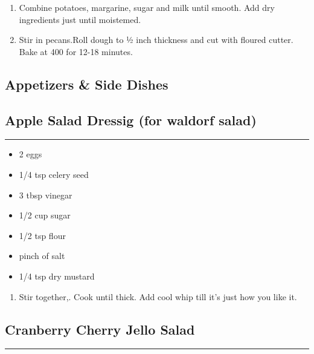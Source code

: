 \documentclass{article}
\begin{document}
\begin{enumerate}
    \item
        Combine potatoes, margarine, sugar and milk until smooth. Add dry ingredients just until moistemed.
    \item
        Stir in pecans.Roll dough to ½ inch thickness and cut with floured cutter. Bake at 400 for 12-18 minutes.
\end{enumerate}
\newpage

\vspace*{\fill}
\begin{center}
    \section{Appetizers \& Side Dishes}
\end{center}
\vspace*{\fill}
\newpage

\subsection{Apple Salad Dressig (for waldorf salad)} 
\noindent\rule[0.5ex]{\linewidth}{1pt}

\begin{framed}
    \begin{itemize}
        \item 2 eggs
        \item 1/4 tsp celery seed
        \item 3 tbsp vinegar
        \item 1/2 cup sugar
        \item 1/2 tsp flour
        \item pinch of salt
        \item 1/4 tsp dry mustard
    \end{itemize}
\end{framed}

\begin{enumerate}
    \item
        Stir together,. Cook until thick. Add cool whip till it’s just how you like it.
\end{enumerate}
\newpage

\subsection{Cranberry Cherry Jello Salad} 
\noindent\rule[0.5ex]{\linewidth}{1pt}
\end{document}
